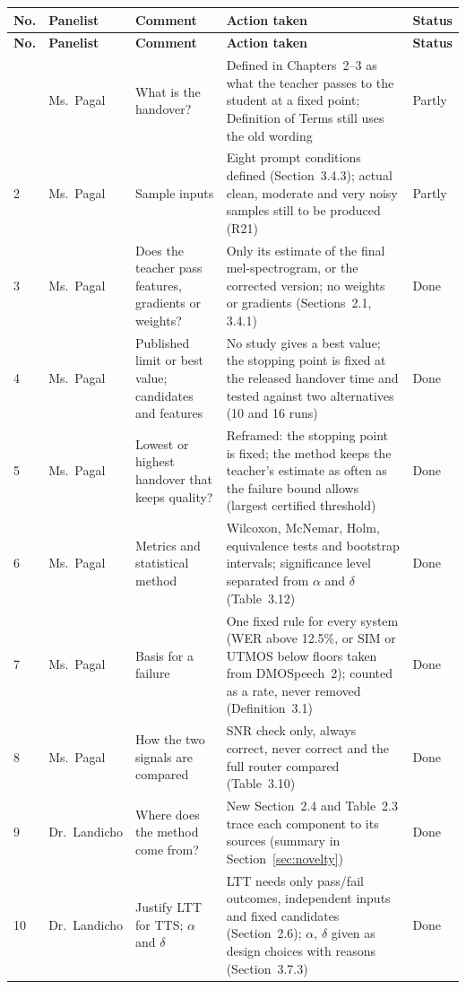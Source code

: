 \documentclass[11pt,a4paper]{article}
\begin{document}
{\small
\begin{longtable}{@{}P{0.65cm} P{1.95cm} P{3.9cm} P{6.4cm} P{1.3cm}@{}}
\toprule
\textbf{No.} & \textbf{Panelist} & \textbf{Comment} & \textbf{Action taken} & \textbf{Status} \\
\midrule
\endfirsthead
\toprule
\textbf{No.} & \textbf{Panelist} & \textbf{Comment} & \textbf{Action taken} & \textbf{Status} \\
\midrule
\endhead
\bottomrule
{} & Ms.~Pagal & What is the handover? & Defined in Chapters~2--3 as what the teacher passes to the student at a fixed point; Definition of Terms still uses the old wording & Partly \\
2 & Ms.~Pagal & Sample inputs & Eight prompt conditions defined (Section~3.4.3); actual clean, moderate and very noisy samples still to be produced (R21) & Partly \\
3 & Ms.~Pagal & Does the teacher pass features, gradients or weights? & Only its estimate of the final mel-spectrogram, or the corrected version; no weights or gradients (Sections~2.1, 3.4.1) & Done \\
4 & Ms.~Pagal & Published limit or best value; candidates and features & No study gives a best value; the stopping point is fixed at the released handover time and tested against two alternatives (10 and 16 runs) & Done \\
5 & Ms.~Pagal & Lowest or highest handover that keeps quality? & Reframed: the stopping point is fixed; the method keeps the teacher's estimate as often as the failure bound allows (largest certified threshold) & Done \\
6 & Ms.~Pagal & Metrics and statistical method & Wilcoxon, McNemar, Holm, equivalence tests and bootstrap intervals; significance level separated from $\alpha$ and $\delta$ (Table~3.12) & Done \\
7 & Ms.~Pagal & Basis for a failure & One fixed rule for every system (WER above 12.5\%, or SIM or UTMOS below floors taken from DMOSpeech~2); counted as a rate, never removed (Definition~3.1) & Done \\
8 & Ms.~Pagal & How the two signals are compared & SNR check only, always correct, never correct and the full router compared (Table~3.10) & Done \\
9 & Dr.~Landicho & Where does the method come from? & New Section~2.4 and Table~2.3 trace each component to its sources (summary in Section~\ref{sec:novelty}) & Done \\
10 & Dr.~Landicho & Justify LTT for TTS; $\alpha$ and $\delta$ & LTT needs only pass/fail outcomes, independent inputs and fixed candidates (Section~2.6); $\alpha$, $\delta$ given as design choices with reasons (Section~3.7.3) & Done \\

\end{longtable}}
\end{document}
